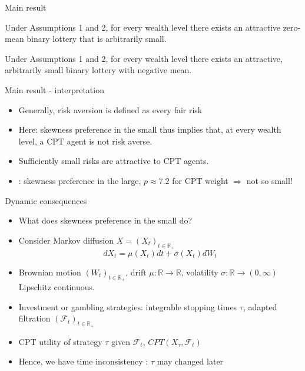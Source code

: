 \documentclass[11pt, aspectratio=169]{beamer}
\begin{document}
\begin{frame}{Main result}
    \begin{theorem}
        Under Assumptions 1 and 2, for every wealth level there exists an attractive zero-mean binary lottery that is arbitrarily small.
	\end{theorem}

    \begin{corollary}
        Under Assumptions 1 and 2, for every wealth level there exists an attractive, arbitrarily small binary lottery with negative mean.
	\end{corollary}
\end{frame}

\begin{frame}{Main result - interpretation}
    \begin{itemize}
        \item Generally, risk aversion is defined as every fair risk\medskip
        \item Here: skewness preference in the small thus implies that, at every wealth level, a CPT agent is not risk averse.\medskip
        \item Sufficiently small risks are attractive to CPT agents.\medskip
        \item \citet{AzevedoGottlieb2012}: skewness preference in the large, $p\approx 7.2$ for CPT weight $\Rightarrow$ not so small!\medskip
	\end{itemize}
\end{frame}

\begin{frame}{Dynamic consequences}
    \begin{itemize}
        \item What does skewness preference in the small do?\medskip
        \item Consider Markov diffusion $ X= (X_t)_{t \in \mathbb{R}_+ }$
        \[dX_t = \mu(X_t)dt + \sigma (X_t)dW_t\]
        \item Brownian motion $(W_t)_{t \in \mathbb{R}_+ }$, drift $\mu:\mathbb{R} \rightarrow \mathbb{R}$, volatility $\sigma: \mathbb{R}  \rightarrow (0,\infty)$ Lipschitz continuous.\medskip
        \item Investment or gambling strategies: integrable stopping times $\tau$, adapted filtration $(\mathcal{F} _t)_{t \in \mathbb{R}_+ }$\medskip
        \item CPT utility of strategy $\tau$ given $\mathcal{F} _t$, $CPT(X_\tau,\mathcal{F}_t)$\medskip
        \item Hence, we have  time inconsistency \citep{Barberis2012a}: $\tau$ may changed later\medskip
       	\end{itemize}
\end{frame}
\end{document}
